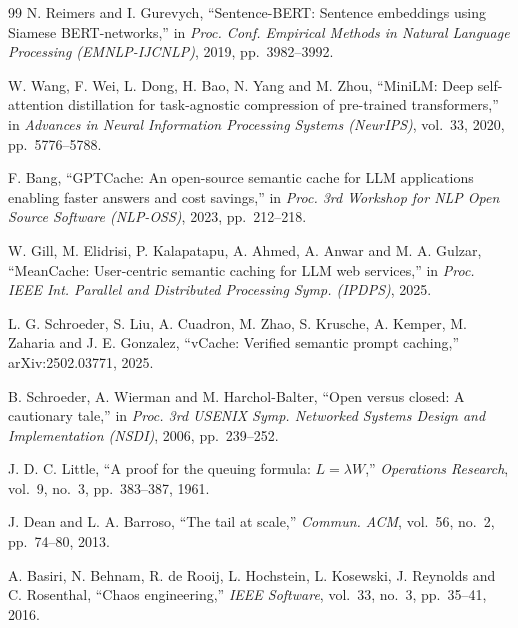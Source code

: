 \begin{singlespace}
\begin{thebibliography}{99}
N. Reimers and I. Gurevych, ``Sentence-BERT: Sentence embeddings using Siamese
BERT-networks,'' in \emph{Proc. Conf. Empirical Methods in Natural Language
Processing (EMNLP-IJCNLP)}, 2019, pp.~3982--3992.

W. Wang, F. Wei, L. Dong, H. Bao, N. Yang and M. Zhou, ``MiniLM: Deep
self-attention distillation for task-agnostic compression of pre-trained
transformers,'' in \emph{Advances in Neural Information Processing Systems
(NeurIPS)}, vol.~33, 2020, pp.~5776--5788.

F. Bang, ``GPTCache: An open-source semantic cache for LLM applications
enabling faster answers and cost savings,'' in \emph{Proc. 3rd Workshop for
NLP Open Source Software (NLP-OSS)}, 2023, pp.~212--218.

W. Gill, M. Elidrisi, P. Kalapatapu, A. Ahmed, A. Anwar and M. A. Gulzar,
``MeanCache: User-centric semantic caching for LLM web services,'' in
\emph{Proc. IEEE Int. Parallel and Distributed Processing Symp. (IPDPS)},
2025.

L. G. Schroeder, S. Liu, A. Cuadron, M. Zhao, S. Krusche, A. Kemper,
M. Zaharia and J. E. Gonzalez, ``vCache: Verified semantic prompt caching,''
arXiv:2502.03771, 2025.

B. Schroeder, A. Wierman and M. Harchol-Balter, ``Open versus closed: A
cautionary tale,'' in \emph{Proc. 3rd USENIX Symp. Networked Systems Design
and Implementation (NSDI)}, 2006, pp.~239--252.

J. D. C. Little, ``A proof for the queuing formula: $L = \lambda W$,''
\emph{Operations Research}, vol.~9, no.~3, pp.~383--387, 1961.

J. Dean and L. A. Barroso, ``The tail at scale,'' \emph{Commun. ACM},
vol.~56, no.~2, pp.~74--80, 2013.

A. Basiri, N. Behnam, R. de Rooij, L. Hochstein, L. Kosewski, J. Reynolds and
C. Rosenthal, ``Chaos engineering,'' \emph{IEEE Software}, vol.~33, no.~3,
pp.~35--41, 2016.

\end{thebibliography}
\end{singlespace}
